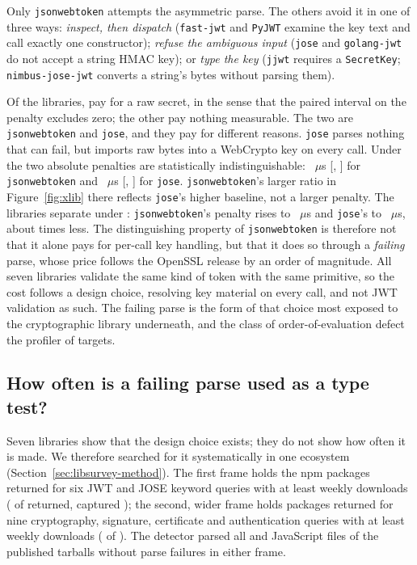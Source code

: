 \documentclass[preprint,12pt,authoryear]{elsarticle}
\newcommand{\LibraryName}{\texttt{jsonwebtoken}}
\begin{document}
Only \LibraryName{} attempts the asymmetric parse. The others avoid it in one of
three ways: \emph{inspect, then dispatch} (\texttt{fast-jwt} and \texttt{PyJWT}
examine the key text and call exactly one constructor); \emph{refuse the
ambiguous input} (\texttt{jose} and \texttt{golang-jwt} do not accept a string
HMAC key); or \emph{type the key} (\texttt{jjwt} requires a \texttt{SecretKey};
\texttt{nimbus-jose-jwt} converts a string's bytes without parsing them).

Of the \XlibLibCount{} libraries, \XlibPenaltyLibCount{} pay for a raw secret,
in the sense that the paired interval on the penalty excludes zero; the other
\XlibZeroPenaltyLibCount{} pay nothing measurable. The two are \LibraryName{}
and \texttt{jose}, and they pay for different reasons. \texttt{jose} parses
nothing that can fail, but imports raw bytes into a WebCrypto key on every
call. Under \XlibJsonwebtokenNewSslBackend{} the two absolute penalties are
statistically indistinguishable: \XlibJsonwebtokenNewSslPenalty~$\mu$s
[\XlibJsonwebtokenNewSslPenaltyCiLo, \XlibJsonwebtokenNewSslPenaltyCiHi] for
\LibraryName{} and \XlibJoseNewSslPenalty~$\mu$s [\XlibJoseNewSslPenaltyCiLo,
\XlibJoseNewSslPenaltyCiHi] for \texttt{jose}. \LibraryName{}'s larger ratio in
Figure~\ref{fig:xlib} there reflects \texttt{jose}'s higher baseline, not a
larger penalty. The libraries separate under \XlibJsonwebtokenOldSslBackend:
\LibraryName{}'s penalty rises to \XlibJsonwebtokenOldSslPenalty~$\mu$s and
\texttt{jose}'s to \XlibJoseOldSslPenalty~$\mu$s, about \XlibJwtOverJoseOldSsl{}
times less. The distinguishing property of \LibraryName{} is therefore not that
it alone pays for per-call key handling, but that it does so through a
\emph{failing} parse, whose price follows the OpenSSL release by an order of
magnitude. All seven libraries validate the same kind of token with the same
primitive, so the cost follows a design choice, resolving key material on every
call, and not JWT validation as such. The failing parse is the form of that
choice most exposed to the cryptographic library underneath, and the class of
order-of-evaluation defect the profiler of \citet{selakovic2017actionable}
targets.

\subsection{How often is a failing parse used as a type test?}\label{sec:libsurvey}

Seven libraries show that the design choice exists; they do not show how often
it is made. We therefore searched for it systematically in one ecosystem
(Section~\ref{sec:libsurvey-method}). The first frame holds the npm packages
returned for six JWT and JOSE keyword queries with at least \LibJwtThreshold{}
weekly downloads (\LibJwtInFrame{} of \LibJwtReturned{} returned, captured
\LibJwtCaptured); the second, wider frame holds packages returned for nine
cryptography, signature, certificate and authentication queries with at least
\LibCryptoThreshold{} weekly downloads (\LibCryptoInFrame{} of
\LibCryptoReturned). The detector parsed all \LibJwtFiles{} and
\LibCryptoFiles{} JavaScript files of the published tarballs without parse
failures in either frame.
\end{document}
